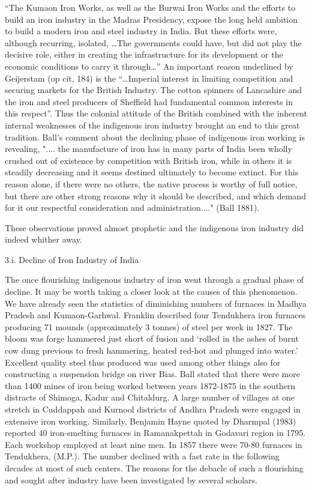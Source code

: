 “The Kumaon Iron Works, as well as the Burwai Iron Works and the efforts to build an iron industry in the Madras Presidency, expose the long held ambition to build a modern iron and steel industry in India. But these efforts were, although recurring, isolated, …The governments could have, but did not play the decisive role, either in creating the infrastructure for its development or the economic conditions to carry it through…” An important reason underlined by Geijerstam (op cit, 184) is the “…Imperial interest in limiting competition and securing markets for the British Industry. The cotton spinners of Lancashire and the iron and steel producers of Sheffield had fundamental common interests in this respect”. Thus the colonial attitude of the British combined with the inherent internal weaknesses of the indigenous iron industry brought an end to this great tradition. Ball's comment about the declining phase of indigenous iron working is revealing, ".... the manufacture of iron has in many parts of India been wholly crushed out of existence by competition with British iron, while in others it is steadily decreasing and it seems destined ultimately to become extinct. For this reason alone, if there were no others, the native process is worthy of full notice, but there are other strong reasons why it should be described, and which demand for it our respectful consideration and administration...." (Ball 1881).

These observations proved almost prophetic and the indigenous iron industry did indeed whither away.

3.i. Decline of Iron Industry of India

The once flourishing indigenous industry of iron went through a gradual phase of decline. It may be worth taking a closer look at the causes of this phenomenon. We have already seen the statistics of diminishing numbers of furnaces in Madhya Pradesh and Kumaon-Garhwal. Franklin described four Tendukhera iron furnaces producing 71 mounds (approximately 3 tonnes) of steel per week in 1827. The bloom was forge hammered just short of fusion and ‘rolled in the ashes of burnt cow dung previous to fresh hammering, heated red-hot and plunged into water.’ Excellent quality steel thus produced was used among other things also for constructing a suspension bridge on river Bias. Ball stated that there were more than 1400 mines of iron being worked between years 1872-1875 in the southern distracts of Shimoga, Kadur and Chitaldurg. A large number of villages at one stretch in Cuddappah and Kurnool districts of Andhra Pradesh were engaged in extensive iron working. Similarly, Benjamin Hayne quoted by Dharmpal (1983) reported 40 iron-smelting furnaces in Ramanakpettah in Godavari region in 1795. Each workshop employed at least nine men. In 1857 there were 70-80 furnaces in Tendukhera, (M.P.). The number declined with a fast rate in the following decades at most of such centers. The reasons for the debacle of such a flourishing and sought after industry have been investigated by several scholars.

